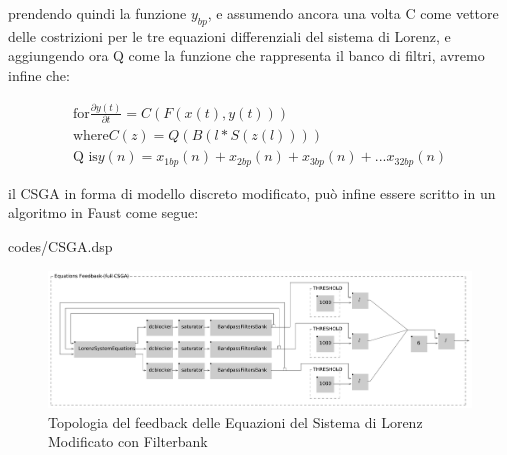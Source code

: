 prendendo quindi la funzione \( y_{bp} \), e assumendo ancora una volta C come vettore delle costrizioni
per le tre equazioni differenziali del sistema di Lorenz, 
e aggiungendo ora Q come la funzione che rappresenta il banco di filtri, 
avremo infine che:

\begin{gather*}
    \text{for} \frac{\partial y(t)}{\partial t} = C(F(x(t), y(t))) \\
    \text{where} C(z) = Q(B(l * S(z(l)))) \\
    \text{Q is} y(n) = x_{1bp}(n) + x_{2bp}(n) + x_{3bp}(n) + ... x_{32bp}(n)
\end{gather*}

il CSGA in forma di modello discreto modificato,
può infine essere scritto in un algoritmo in Faust come segue:

\clearpage 


{codes/CSGA.dsp}

\begin{figure}[h!]
\begin{center}
    \includegraphics[width=14cm]{figures/LorenzSystemFB3.pdf}
    \caption {Topologia del feedback delle Equazioni del Sistema di Lorenz Modificato con Filterbank}
\end{center}
\vspace{0.5cm}
\end{figure}

\clearpage

